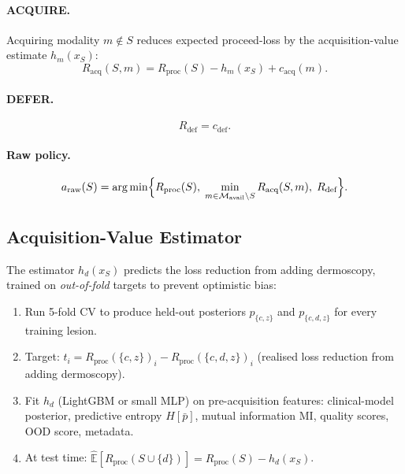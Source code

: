 \documentclass[conference]{IEEEtran}
\DeclareMathOperator*{\argmin}{arg\,min}
\newcommand{\E}{\mathbb{E}}
\newcommand{\1}{\mathbf{1}}
\begin{document}
\paragraph{ACQUIRE.}
Acquiring modality $m \notin S$ reduces expected proceed-loss by the
acquisition-value estimate $h_m(x_S)$:
\begin{equation}
  R_{\text{acq}}(S, m) = R_{\text{proc}}(S) - h_m(x_S) + c_{\text{acq}}(m).
  \label{eq:Racq}
\end{equation}

\paragraph{DEFER.}
\begin{equation}
  R_{\text{def}} = c_{\text{def}}.
  \label{eq:Rdef}
\end{equation}

\paragraph{Raw policy.}
\begin{equation}
  a_{\text{raw}}(S) = \argmin\Bigl\{
    R_{\text{proc}}(S),\;
    \min_{m \in \mathcal{M}_{\text{avail}}\setminus S} R_{\text{acq}}(S,m),\;
    R_{\text{def}}
  \Bigr\}.
  \label{eq:policy_raw}
\end{equation}

\subsection{Acquisition-Value Estimator}

The estimator $h_d(x_S)$ predicts the loss reduction from adding dermoscopy,
trained on \emph{out-of-fold} targets to prevent optimistic bias:

\begin{enumerate}[leftmargin=*, label=\textbf{Step \arabic*.}]
  \item Run 5-fold CV to produce held-out posteriors $p_{\{c,z\}}$ and
        $p_{\{c,d,z\}}$ for every training lesion.
  \item Target: $t_i = R_{\text{proc}}(\{c,z\})_i - R_{\text{proc}}(\{c,d,z\})_i$
        (realised loss reduction from adding dermoscopy).
  \item Fit $h_d$ (LightGBM or small MLP) on pre-acquisition features:
        clinical-model posterior, predictive entropy $H[\bar{p}]$, mutual
        information MI, quality scores, OOD score, metadata.
  \item At test time: $\hat{\E}[R_{\text{proc}}(S\cup\{d\})] = R_{\text{proc}}(S) - h_d(x_S)$.
\end{enumerate}
\end{document}
